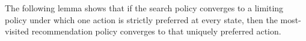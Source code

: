 %
%
%

    \proofsep





    The following lemma shows that if the search policy converges to a limiting policy under which one action is strictly preferred at every state, then the most-visited recommendation policy converges to that uniquely preferred action.

